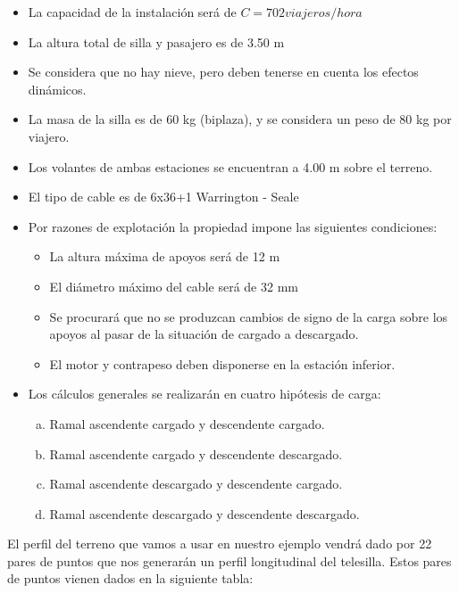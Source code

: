 \documentclass[a4paper,11pt]{article}
\begin{document}
\begin{itemize}
\item La capacidad de la instalación será de $C=702 viajeros/hora$
\item La altura total de silla y pasajero es de 3.50 m
\item Se considera que no hay nieve, pero deben tenerse en cuenta los efectos dinámicos.
\item La masa de la silla es de 60 kg (biplaza), y se considera un peso de 80 kg por viajero.
\item Los volantes de ambas estaciones se encuentran a 4.00 m sobre el terreno.
\item El tipo de cable es de 6x36+1 Warrington - Seale
\item Por razones de explotación la propiedad impone las siguientes condiciones:
\begin{itemize}
\item La altura máxima de apoyos será de 12 m
\item El diámetro máximo del cable será de 32 mm
\item Se procurará que no se produzcan cambios de signo de la carga sobre los apoyos al pasar de la situación de cargado a descargado.
\item El motor y contrapeso deben disponerse en la estación inferior.
\end{itemize}
\item Los cálculos generales se realizarán en cuatro hipótesis de carga:
\begin{enumerate}[a)]
\item Ramal ascendente cargado y descendente cargado.
\item Ramal ascendente cargado y descendente descargado.
\item Ramal ascendente descargado y descendente cargado.
\item Ramal ascendente descargado y descendente descargado.
\end{enumerate}
\end{itemize}
El perfil del terreno que vamos a usar en nuestro ejemplo vendrá dado por 22 pares de puntos que nos generarán un perfil longitudinal del telesilla. Estos pares de puntos vienen dados en la siguiente tabla:\\
\\
\end{document}

